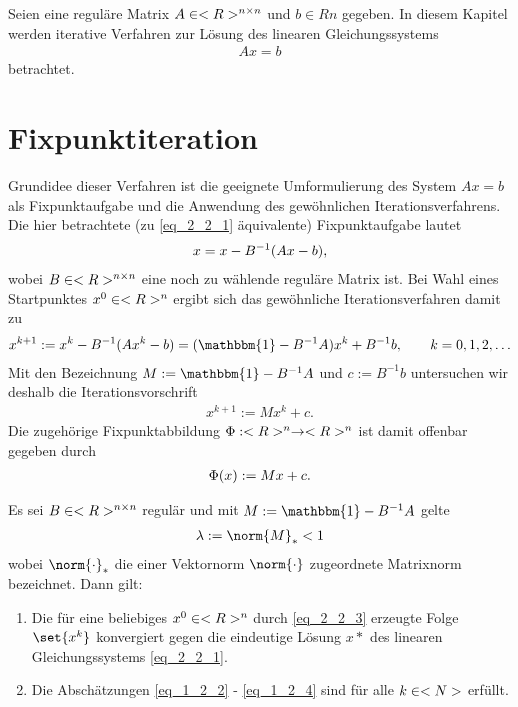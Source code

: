Seien eine reguläre Matrix $A \in <R>^{n \times n}$ und $b \in Rn$ gegeben. In diesem Kapitel werden iterative Verfahren zur Lösung des linearen Gleichungssystems
\begin{align}
Ax = b\label{eq_2_2_1}
\end{align}
betrachtet.
\section{Fixpunktiteration}

Grundidee dieser Verfahren ist die geeignete Umformulierung des System $Ax = b$ als Fixpunktaufgabe und die Anwendung des gewöhnlichen Iterationsverfahrens. Die hier betrachtete (zu \cref{eq_2_2_1} äquivalente) Fixpunktaufgabe lautet
\begin{align}
	x = x - B^{-1}(Ax - b),\notag
\end{align}
wobei $B \in <R>^{n \times n}$ eine noch zu wählende reguläre Matrix ist. Bei Wahl eines Startpunktes $x^0 \in <R>^n$ ergibt sich das gewöhnliche Iterationsverfahren damit zu
\begin{align}
	x^{k+1} := x^{k} - B^{-1}(A x^k -b) = (\mathbbm{1} - B^{-1}A)x^{k} + B^{-1}b, \qquad k = 0,1,2,\dots \label{eq_2_2_2} %
\end{align}
Mit den Bezeichnung $M := \mathbbm{1} - B^{-1}A$ und $c:= B^{-1}b$ untersuchen wir deshalb die Iterationsvorschrift
\begin{align}
	x^{k+1} := Mx^k + c. \label{eq_2_2_3}
\end{align}
Die zugehörige Fixpunktabbildung $\Phi: <R>^n \to <R>^n$ ist damit offenbar gegeben durch
\begin{align}
	\Phi(x) := Mx + c.\notag
\end{align}
\begin{proposition}
	Es sei $B \in <R>^{n \times n}$ regulär und mit $M:= \mathbbm{1} - B^{-1}A$ gelte
	\begin{align}
		\lambda := \norm{M}_{\ast} < 1 \label{eq_2_1_4}
	\end{align}
	wobei $\norm{\cdot}_{\ast}$ die einer Vektornorm $\norm{\cdot}$ zugeordnete Matrixnorm bezeichnet. Dann gilt:
	\begin{enumerate}[label=(\alph*)]
		\item Die für eine beliebiges $x^0 \in <R>^n$ durch \cref{eq_2_2_3} erzeugte Folge $\set{x^k}$ konvergiert gegen die eindeutige Lösung $x*$ des linearen Gleichungssystems \cref{eq_2_2_1}.
		\item Die Abschätzungen \cref{eq_1_2_2} - \cref{eq_1_2_4} sind für alle $k \in <N>$ erfüllt.
	\end{enumerate}
\end{proposition}


